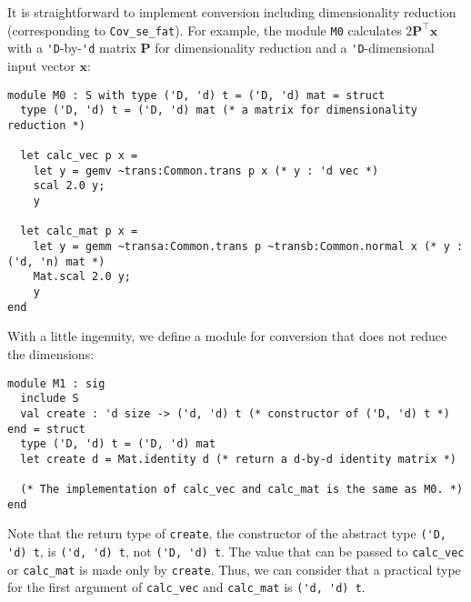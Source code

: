\documentclass[10pt,a4paper]{article}
\begin{document}
It is straightforward to implement conversion including dimensionality reduction
(corresponding to \lstinline|Cov_se_fat|).
For example, the module \lstinline|M0| calculates $2 \bm{P}^\top \bm{x}$
with a \lstinline|'D|-by-\lstinline|'d| matrix $\bm{P}$ for dimensionality
reduction and a \lstinline|'D|-dimensional input vector $\bm{x}$:
\begin{lstlisting}
module M0 : S with type ('D, 'd) t = ('D, 'd) mat = struct
  type ('D, 'd) t = ('D, 'd) mat (* a matrix for dimensionality reduction *)

  let calc_vec p x =
    let y = gemv ~trans:Common.trans p x (* y : 'd vec *)
    scal 2.0 y;
    y

  let calc_mat p x =
    let y = gemm ~transa:Common.trans p ~transb:Common.normal x (* y : ('d, 'n) mat *)
    Mat.scal 2.0 y;
    y
end
\end{lstlisting}
With a little ingenuity, we define a module for conversion that does not reduce
the dimensions:
\begin{lstlisting}
module M1 : sig
  include S
  val create : 'd size -> ('d, 'd) t (* constructor of ('D, 'd) t *)
end = struct
  type ('D, 'd) t = ('D, 'd) mat
  let create d = Mat.identity d (* return a d-by-d identity matrix *)

  (* The implementation of calc_vec and calc_mat is the same as M0. *)
end
\end{lstlisting}
Note that the return type of \lstinline|create|, the constructor of
the abstract type \lstinline|('D, 'd) t|, is \lstinline|('d, 'd) t|,
not \lstinline|('D, 'd) t|.
The value that can be passed to \lstinline|calc_vec| or \lstinline|calc_mat| is
made only by \lstinline|create|. Thus, we can consider that a practical type
for the first argument of \lstinline|calc_vec| and \lstinline|calc_mat| is
\lstinline|('d, 'd) t|.
\end{document}
